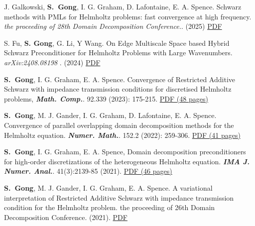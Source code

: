 \documentclass[letterpaper]{article}
\begin{document}
\begin{enumerate}[label={[\arabic*]},leftmargin=*]
\item J. Galkowski, {\bf S.~Gong}, I. G. Graham, D. Lafontaine, E. A. Spence.
Schwarz methods with PMLs for Helmholtz problems: fast convergence at high frequency.   \emph{the proceeding of 28th Domain
  Decomposition Conference.}.  (2025) \href{https://arxiv.org/abs/2408.16580}{PDF} 

\item S. Fu, {\bf S. Gong}, G. Li, Y Wang. On Edge Multiscale Space based Hybrid Schwarz Preconditioner
for Helmholtz Problems with Large Wavenumbers. \emph{arXiv:2408.08198 }. (2024) \href{https://arxiv.org/abs/2408.08198}{PDF}


      \item {\bf S.~Gong}, I. G. Graham, E. A. Spence.  Convergence of Restricted Additive Schwarz with impedance transmission conditions for discretised Helmholtz problems,  {\bf\emph{Math. Comp.}}.  92.339 (2023): 175-215. \href{https://community.ams.org/journals/mcom/2023-92-339/S0025-5718-2022-03772-8/S0025-5718-2022-03772-8.pdf}{PDF (48 pages)}
       
  \item  {\bf S.~Gong}, M. J. Gander, I. G. Graham, D. Lafontaine,  E. A. Spence. Convergence of parallel overlapping domain decomposition methods for the Helmholtz equation.    {\bf\emph{Numer. Math.}}. 152.2 (2022): 259-306. \href{https://link.springer.com/article/10.1007/s00211-022-01318-8}{PDF (41 pages)}
  
  
    
\item {\bf S.~Gong}, I. G. Graham, E. A. Spence,   Domain decomposition preconditioners for high-order discretizations of the heterogeneous Helmholtz equation.  {\bf\emph{IMA J.  Numer. Anal.}}. 41(3):2139-85 (2021). \href{https://doi.org/10.1093/imanum/draa080}{PDF (46 pages)} 

 
 

    \item  {\bf S.~Gong}, M. J. Gander, I. G. Graham, E. A. Spence.  A variational interpretation of Restricted Additive Schwarz with impedance transmission condition for the Helmholtz problem.   the proceeding of 26th Domain
  Decomposition Conference.  (2021). \href{https://arxiv.org/abs/2103.11379}{PDF}



\end{enumerate}
\end{document}
